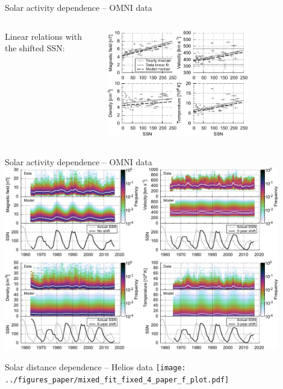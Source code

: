 \begin{frame}[plain,c]{Solar activity dependence -- OMNI data}{}
	\begin{columns}[c]
	\column{\textwidth}
		
		\centering
		Linear relations with the shifted SSN:\\\ 
		
		\includegraphics[width=0.7\textwidth]{../figures_paper/OMNI_yearly_BVNTvsSSN_a.pdf}
		
	\end{columns}
\end{frame}
\begin{frame}[plain,c]{Solar activity dependence -- OMNI data}{}
	\centering
	\includegraphics[width=0.9\textwidth]{../figures_paper/OMNI_yearly_BVdblNTSSN_fit_e_plot.pdf}
\end{frame}
\begin{frame}[plain,c]{Solar distance dependence -- Helios data}{}
	\centering
	\texttt{[image: ../figures\_paper/mixed\_fit\_fixed\_4\_paper\_f\_plot.pdf]}
\end{frame}
